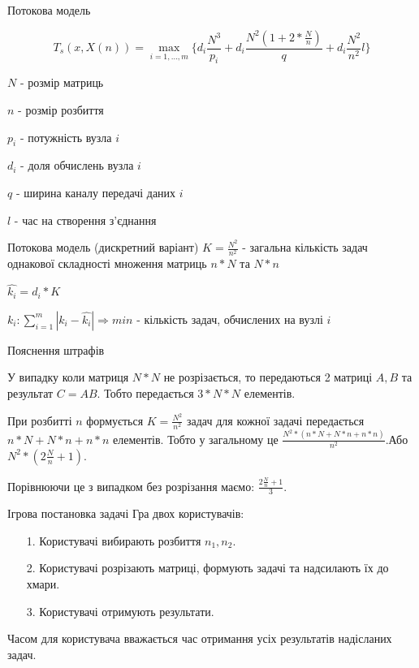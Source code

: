 \begin{frame}{Потокова модель}
	\manimate
	\centering
	
	\begin{equation*}
		T_s(x,X(n)) = \max\limits_{i=1,\ldots,m} \bigg\{ d_i \frac{N^3}{p_i} + d_i \frac{N^2 ( 1 + 2*\frac{N}{n} )}{q} + d_i \frac{N^2}{n^2} l \bigg\}
	\end{equation*}
	
	$N$ - розмір матриць

	$n$ - розмір розбиття	
	
	$p_i$ - потужність вузла $i$
	
	$d_i$ - доля обчислень вузла $i$
	
	$q$ - ширина каналу передачі даних $i$
	
	$l$ - час на створення з'єднання

\end{frame}

\begin{frame}{Потокова модель (дискретний варіант)}
	\manimate
	\centering
	$K = \frac{N^2}{n^2}$ - загальна кількість задач однакової складності множення матриць $n*N$ та $N*n$

	$\hat{k_i} = d_i * K$

	$k_i: \sum_{i=1}^{m} |k_i - \hat{k_i}| \Rightarrow min$ - кількість задач, обчислених на вузлі $i$

\end{frame}

\begin{frame}{Пояснення штрафів}
	\manimate
	\centering
	
	У випадку коли матриця $N*N$ не розрізається, то передаються 2 матриці $A,B$ та результат $C=AB$. Тобто передається $3*N*N$ елементів.
	
	При розбитті $n$ формується $K = \frac{N^2}{n^2}$ задач для кожної задачі передається $n*N + N*n + n*n$ елементів. Тобто у загальному це $\frac{N^2*(n*N + N*n + n*n)}{n^2}$.Або $N^2*(2\frac{N}{n}+1)$.
	
	Порівнюючи це з випадком без розрізання маємо: $\frac{2\frac{N}{n}+1}{3}$.
	
\end{frame}

\begin{frame}{Ігрова постановка задачі}
	\manimate
	Гра двох користувачів:
	\begin{itemize}
		\item[1.] Користувачі вибирають розбиття $n_1, n_2$.
		\item[2.] Користувачі розрізають матриці, формують задачі та надсилають їх до хмари.
		\item[3.] Користувачі отримують результати.
	\end{itemize}
	Часом для користувача вважається час отримання усіх результатів надісланих задач.
\end{frame}

